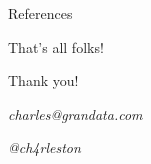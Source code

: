 \documentclass[usenames,dvipsnames]{beamer}
\begin{document}
\begin{frame}{References}
\justifying%

{}

\end{frame}

\begin{frame}{That's all folks!}
\centering
\begin{huge}
Thank you!
\end{huge}

\bigskip
\bigskip
\begin{Large}


\emph{charles@grandata.com}

\medskip
\emph{@ch4rleston}
\end{Large}

\end{frame}
\end{document}
